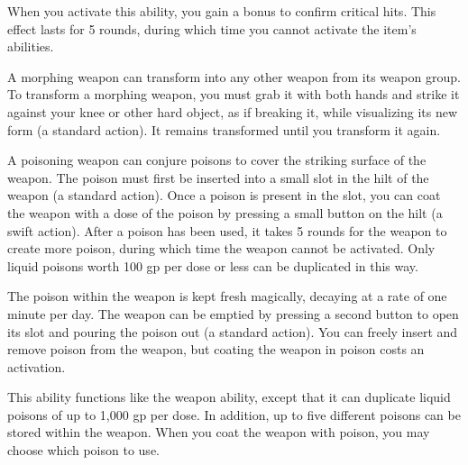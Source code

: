 When you activate this ability, you gain a  bonus to confirm critical hits.
This effect lasts for 5 rounds, during which time you cannot activate the item's abilities.


 A morphing weapon can transform into any other weapon from its weapon group.
To transform a morphing weapon, you must grab it with both hands and strike it against your knee or other hard object, as if breaking it, while visualizing its new form (a standard action).
It remains transformed until you transform it again.


 A poisoning weapon can conjure poisons to cover the striking surface of the weapon.
The poison must first be inserted into a small slot in the hilt of the weapon (a standard action).
Once a poison is present in the slot, you can coat the weapon with a dose of the poison by pressing a small button on the hilt (a swift action).
After a poison has been used, it takes 5 rounds for the weapon to create more poison, during which time the weapon cannot be activated.
Only liquid poisons worth 100 gp per dose or less can be duplicated in this way.

The poison within the weapon is kept fresh magically, decaying at a rate of one minute per day.
The weapon can be emptied by pressing a second button to open its slot and pouring the poison out (a standard action).
You can freely insert and remove poison from the weapon, but coating the weapon in poison costs an activation.


 This ability functions like the  weapon ability, except that it can duplicate liquid poisons of up to 1,000 gp per dose.
In addition, up to five different poisons can be stored within the weapon.
When you coat the weapon with poison, you may choose which poison to use.


